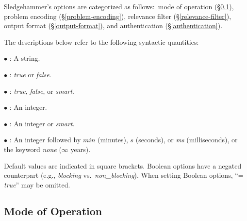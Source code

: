 \documentclass[a4paper,12pt]{article}
\begin{document}
Sledgehammer's options are categorized as follows:\ mode of operation
(\S\ref{mode-of-operation}), problem encoding (\S\ref{problem-encoding}),
relevance filter (\S\ref{relevance-filter}), output format
(\S\ref{output-format}), and authentication (\S\ref{authentication}).

The descriptions below refer to the following syntactic quantities:

\begin{enum}
\item[$\bullet$] : A string.
\item[$\bullet$] : \textit{true} or \textit{false}.
\item[$\bullet$] : \textit{true}, \textit{false}, or \textit{smart}.
\item[$\bullet$] : An integer.
\item[$\bullet$] : An integer or \textit{smart}.
\item[$\bullet$] : An integer followed by $\textit{min}$ (minutes), $s$ (seconds), or \textit{ms}
(milliseconds), or the keyword \textit{none} ($\infty$ years).
\end{enum}

Default values are indicated in square brackets. Boolean options have a negated
counterpart (e.g., \textit{blocking} vs.\ \textit{non\_blocking}). When setting
Boolean options, ``= \textit{true}'' may be omitted.

\subsection{Mode of Operation}
\label{mode-of-operation}
\end{document}
